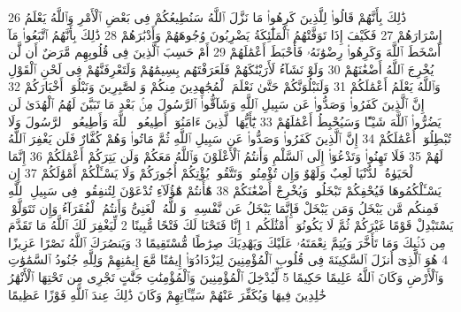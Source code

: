 {\tiny\colorbox{cl_aya}{26}} ذَٰلِكَ بِأَنَّهُمْ قَالُوا۟ لِلَّذِينَ كَرِهُوا۟ مَا نَزَّلَ ٱللَّهُ سَنُطِيعُكُمْ فِى بَعْضِ ٱلْأَمْرِ وَٱللَّهُ يَعْلَمُ إِسْرَارَهُمْ
{\tiny\colorbox{cl_aya}{27}} فَكَيْفَ إِذَا تَوَفَّتْهُمُ ٱلْمَلَٰٓئِكَةُ يَضْرِبُونَ وُجُوهَهُمْ وَأَدْبَٰرَهُمْ
{\tiny\colorbox{cl_aya}{28}} ذَٰلِكَ بِأَنَّهُمُ ٱتَّبَعُوا۟ مَآ أَسْخَطَ ٱللَّهَ وَكَرِهُوا۟ رِضْوَٰنَهُۥ فَأَحْبَطَ أَعْمَٰلَهُمْ
{\tiny\colorbox{cl_aya}{29}} أَمْ حَسِبَ ٱلَّذِينَ فِى قُلُوبِهِم مَّرَضٌ أَن لَّن يُخْرِجَ ٱللَّهُ أَضْغَٰنَهُمْ
{\tiny\colorbox{cl_aya}{30}} وَلَوْ نَشَآءُ لَأَرَيْنَٰكَهُمْ فَلَعَرَفْتَهُم بِسِيمَٰهُمْ وَلَتَعْرِفَنَّهُمْ فِى لَحْنِ ٱلْقَوْلِ وَٱللَّهُ يَعْلَمُ أَعْمَٰلَكُمْ
{\tiny\colorbox{cl_aya}{31}} وَلَنَبْلُوَنَّكُمْ حَتَّىٰ نَعْلَمَ ٱلْمُجَٰهِدِينَ مِنكُمْ وَٱلصَّٰبِرِينَ وَنَبْلُوَا۟ أَخْبَارَكُمْ
{\tiny\colorbox{cl_aya}{32}} إِنَّ ٱلَّذِينَ كَفَرُوا۟ وَصَدُّوا۟ عَن سَبِيلِ ٱللَّهِ وَشَآقُّوا۟ ٱلرَّسُولَ مِنۢ بَعْدِ مَا تَبَيَّنَ لَهُمُ ٱلْهُدَىٰ لَن يَضُرُّوا۟ ٱللَّهَ شَيْـًٔا وَسَيُحْبِطُ أَعْمَٰلَهُمْ
{\tiny\colorbox{cl_aya}{33}} يَٰٓأَيُّهَا ٱلَّذِينَ ءَامَنُوٓا۟ أَطِيعُوا۟ ٱللَّهَ وَأَطِيعُوا۟ ٱلرَّسُولَ وَلَا تُبْطِلُوٓا۟ أَعْمَٰلَكُمْ
{\tiny\colorbox{cl_aya}{34}} إِنَّ ٱلَّذِينَ كَفَرُوا۟ وَصَدُّوا۟ عَن سَبِيلِ ٱللَّهِ ثُمَّ مَاتُوا۟ وَهُمْ كُفَّارٌ فَلَن يَغْفِرَ ٱللَّهُ لَهُمْ
{\tiny\colorbox{cl_aya}{35}} فَلَا تَهِنُوا۟ وَتَدْعُوٓا۟ إِلَى ٱلسَّلْمِ وَأَنتُمُ ٱلْأَعْلَوْنَ وَٱللَّهُ مَعَكُمْ وَلَن يَتِرَكُمْ أَعْمَٰلَكُمْ
{\tiny\colorbox{cl_aya}{36}} إِنَّمَا ٱلْحَيَوٰةُ ٱلدُّنْيَا لَعِبٌ وَلَهْوٌ وَإِن تُؤْمِنُوا۟ وَتَتَّقُوا۟ يُؤْتِكُمْ أُجُورَكُمْ وَلَا يَسْـَٔلْكُمْ أَمْوَٰلَكُمْ
{\tiny\colorbox{cl_aya}{37}} إِن يَسْـَٔلْكُمُوهَا فَيُحْفِكُمْ تَبْخَلُوا۟ وَيُخْرِجْ أَضْغَٰنَكُمْ
{\tiny\colorbox{cl_aya}{38}} هَٰٓأَنتُمْ هَٰٓؤُلَآءِ تُدْعَوْنَ لِتُنفِقُوا۟ فِى سَبِيلِ ٱللَّهِ فَمِنكُم مَّن يَبْخَلُ وَمَن يَبْخَلْ فَإِنَّمَا يَبْخَلُ عَن نَّفْسِهِۦ وَٱللَّهُ ٱلْغَنِىُّ وَأَنتُمُ ٱلْفُقَرَآءُ وَإِن تَتَوَلَّوْا۟ يَسْتَبْدِلْ قَوْمًا غَيْرَكُمْ ثُمَّ لَا يَكُونُوٓا۟ أَمْثَٰلَكُم
{\tiny\colorbox{cl_aya}{1}} إِنَّا فَتَحْنَا لَكَ فَتْحًا مُّبِينًا
{\tiny\colorbox{cl_aya}{2}} لِّيَغْفِرَ لَكَ ٱللَّهُ مَا تَقَدَّمَ مِن ذَنۢبِكَ وَمَا تَأَخَّرَ وَيُتِمَّ نِعْمَتَهُۥ عَلَيْكَ وَيَهْدِيَكَ صِرَٰطًا مُّسْتَقِيمًا
{\tiny\colorbox{cl_aya}{3}} وَيَنصُرَكَ ٱللَّهُ نَصْرًا عَزِيزًا
{\tiny\colorbox{cl_aya}{4}} هُوَ ٱلَّذِىٓ أَنزَلَ ٱلسَّكِينَةَ فِى قُلُوبِ ٱلْمُؤْمِنِينَ لِيَزْدَادُوٓا۟ إِيمَٰنًا مَّعَ إِيمَٰنِهِمْ وَلِلَّهِ جُنُودُ ٱلسَّمَٰوَٰتِ وَٱلْأَرْضِ وَكَانَ ٱللَّهُ عَلِيمًا حَكِيمًا
{\tiny\colorbox{cl_aya}{5}} لِّيُدْخِلَ ٱلْمُؤْمِنِينَ وَٱلْمُؤْمِنَٰتِ جَنَّٰتٍ تَجْرِى مِن تَحْتِهَا ٱلْأَنْهَٰرُ خَٰلِدِينَ فِيهَا وَيُكَفِّرَ عَنْهُمْ سَيِّـَٔاتِهِمْ وَكَانَ ذَٰلِكَ عِندَ ٱللَّهِ فَوْزًا عَظِيمًا
